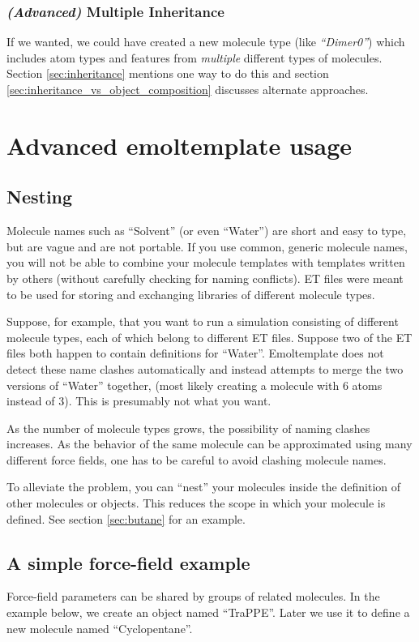 \documentclass[11pt]{article}
\begin{document}
\subsubsection*{\textit{(Advanced)} Multiple Inheritance}
If we wanted, we could have created a new molecule type 
(like \textit{``Dimer0''}) 
which includes atom types and features from 
\textit{multiple} different types of molecules.
Section \ref{sec:inheritance} mentions one way to do this
and section \ref{sec:inheritance_vs_object_composition}
discusses alternate approaches.



\section*{Advanced emoltemplate usage}



\subsection{Nesting}
\label{sec:nesting}
Molecule names such as ``Solvent'' (or even ``Water'')
are short and easy to type, but are vague and are not portable.
If you use common, generic molecule names, you will not be able
to combine your molecule templates with templates written 
by others (without carefully checking for naming conflicts).
ET files were meant to be used for storing 
and exchanging libraries of different molecule types.

Suppose, for example, that you want to run a simulation consisting of
different molecule types, each of which belong to different ET files.
Suppose two of the ET files both happen to contain definitions for
``Water''.
Emoltemplate does not detect these name clashes automatically 
and instead attempts to merge the two versions of ``Water'' together,
(most likely creating a molecule with 6 atoms instead of 3).
This is presumably not what you want.

As the number of molecule types grows, 
the possibility of naming clashes increases. 
As the behavior of the same molecule can be approximated 
using many different force fields, 
one has to be careful to avoid clashing molecule names.

To alleviate the problem, you can ``nest'' your 
molecules inside the definition of other molecules or objects.
This reduces the scope in which your molecule is defined.
See section \ref{sec:butane} for an example.


\subsection{A simple force-field example}
Force-field parameters can be shared by groups of related molecules.
In the example below, we create an object named ``TraPPE''.
Later we use it to define a new molecule named ``Cyclopentane''.
\end{document}
